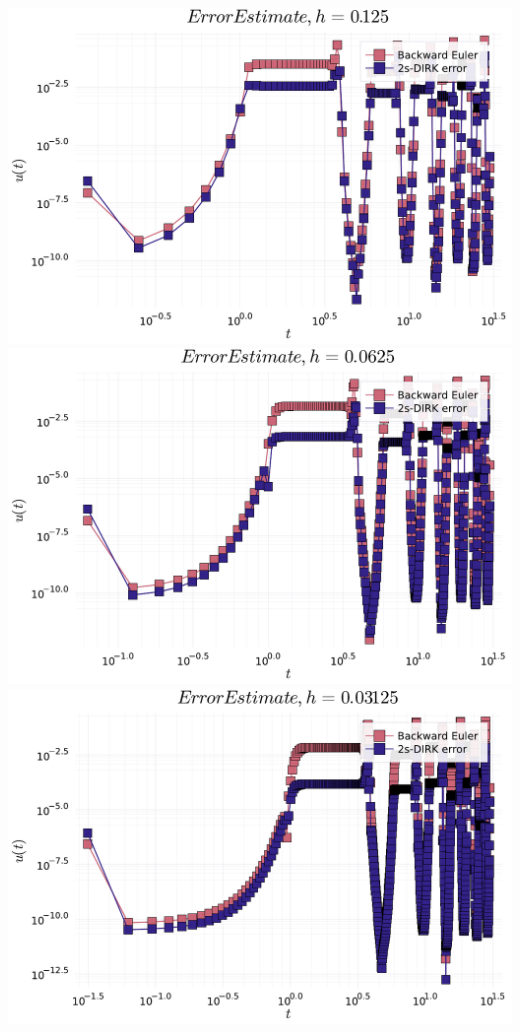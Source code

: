 \documentclass[12pt,a4paper]{article}
\begin{document}
\includegraphics[width=\linewidth]{figures/ass_3_report_9_1.pdf}
\includegraphics[width=\linewidth]{figures/ass_3_report_9_2.pdf}
\includegraphics[width=\linewidth]{figures/ass_3_report_9_3.pdf}
\end{document}
